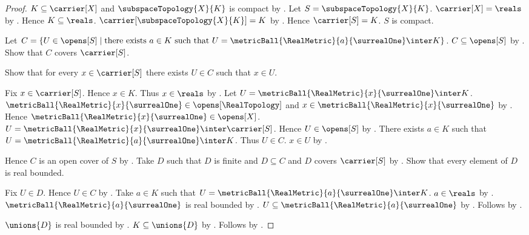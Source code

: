 \begin{proof}
    $K\subseteq\carrier[X]$ and $\subspaceTopology{X}{K}$ is compact by
        .
    Let $S=\subspaceTopology{X}{K}$.
    $\carrier[X]=\reals$ by .
    Hence $K\subseteq\reals$.
    $\carrier[\subspaceTopology{X}{K}]=K$ by
        .
    Hence $\carrier[S]=K$.
    $S$ is compact.

    Let $C=\{U\in\opens[S]\mid
        \text{there exists $a\in K$ such that
            $U=\metricBall{\RealMetric}{a}{\surrealOne}\inter K$}\}$.
    $C\subseteq\opens[S]$ by .
    Show that $C$ covers $\carrier[S]$.
    \begin{subproof}
        Show that for every $x\in\carrier[S]$ there exists $U\in C$
            such that $x\in U$.
        \begin{subproof}
            Fix $x\in\carrier[S]$.
            Hence $x\in K$.
            Thus $x\in\reals$ by .
            Let $U=\metricBall{\RealMetric}{x}{\surrealOne}\inter K$.
            $\metricBall{\RealMetric}{x}{\surrealOne}
                \in\opens[\RealTopology]$ and
                $x\in\metricBall{\RealMetric}{x}{\surrealOne}$ by
                .
            Hence $\metricBall{\RealMetric}{x}{\surrealOne}
                \in\opens[X]$.
            $U=\metricBall{\RealMetric}{x}{\surrealOne}\inter
                \carrier[S]$.
            Hence $U\in\opens[S]$ by
                .
            There exists $a\in K$ such that
                $U=\metricBall{\RealMetric}{a}{\surrealOne}\inter K$.
            Thus $U\in C$.
            $x\in U$ by .
        \end{subproof}
    \end{subproof}
    Hence $C$ is an open cover of $S$ by .
    Take $D$ such that $D$ is finite and $D\subseteq C$ and
        $D$ covers $\carrier[S]$ by .
    Show that every element of $D$ is real bounded.
    \begin{subproof}
        Fix $U\in D$.
        Hence $U\in C$ by .
        Take $a\in K$ such that
            $U=\metricBall{\RealMetric}{a}{\surrealOne}\inter K$.
        $a\in\reals$ by .
        $\metricBall{\RealMetric}{a}{\surrealOne}$ is real bounded by
            .
        $U\subseteq\metricBall{\RealMetric}{a}{\surrealOne}$ by
            .
        Follows by .
    \end{subproof}
    $\unions{D}$ is real bounded by
        .
    $K\subseteq\unions{D}$ by
        .
    Follows by .
\end{proof}

